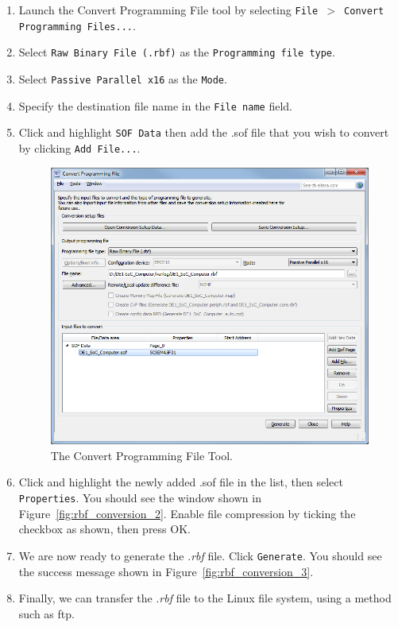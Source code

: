 \documentclass[11pt, twoside, pdftex]{article}
\begin{document}
\begin{enumerate}
\item Launch the Convert Programming File tool by selecting \texttt{File $>$ Convert Programming Files...}.
\item Select \texttt{Raw Binary File (.rbf)} as the \texttt{Programming file type}.
\item Select \texttt{Passive Parallel x16} as the \texttt{Mode}.
\item Specify the destination file name in the \texttt{File name} field.
\item Click and highlight \texttt{SOF Data} then add the .sof file that you wish to
convert by clicking \texttt{Add File...}.

\begin{figure}[h]
   \begin{center}
       \includegraphics[scale=0.7]{figures/rbf_conversion_1}
   \end{center}
   \caption{The Convert Programming File Tool.}
	\label{fig:rbf_conversion_1}
\end{figure}

\item Click and highlight the newly added .sof file in the list, then select
\texttt{Properties}. You should see the window shown in Figure~\ref{fig:rbf_conversion_2}. 
Enable file compression by ticking the checkbox as shown, then press OK.
\item We are now ready to generate the .{\it rbf} file. Click \texttt{Generate}. You should
see the success message shown in Figure~\ref{fig:rbf_conversion_3}. 
\item Finally, we can transfer the .{\it rbf} file to the Linux file system, using a method such 
as ftp.
\end{enumerate}
\end{document}

